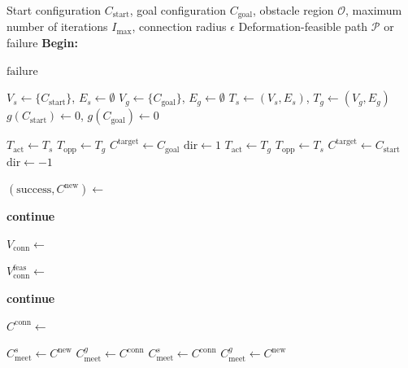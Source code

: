 \documentclass{pas}
\begin{document}
\begin{algorithm}[t]
\small
\caption{Global Cable Routing Planner}
\label{alg:gcr_main}
\begin{algorithmic}[1]
\Require Start configuration $C_{\mathrm{start}}$, goal configuration
$C_{\mathrm{goal}}$, obstacle region $\mathcal{O}$, maximum number of
iterations $I_{\max}$, connection radius $\epsilon$
\Ensure Deformation-feasible path $\mathcal{P}$ or failure
\Statex \textbf{Begin:}

    \State \Return $\mathrm{failure}$
\EndIf

\State $V_s\gets\{C_{\mathrm{start}}\}$, $E_s\gets\emptyset$
\State $V_g\gets\{C_{\mathrm{goal}}\}$, $E_g\gets\emptyset$
\State $T_s\gets(V_s,E_s)$, $T_g\gets(V_g,E_g)$
\State $g(C_{\mathrm{start}})\gets0$, $g(C_{\mathrm{goal}})\gets0$


        \State $T_{\mathrm{act}}\gets T_s$
        \State $T_{\mathrm{opp}}\gets T_g$
        \State $C^{\mathrm{target}}\gets C_{\mathrm{goal}}$
        \State $\mathrm{dir}\gets 1$
    \Else
        \State $T_{\mathrm{act}}\gets T_g$
        \State $T_{\mathrm{opp}}\gets T_s$
        \State $C^{\mathrm{target}}\gets C_{\mathrm{start}}$
        \State $\mathrm{dir}\gets -1$
    \EndIf

    \State $(\mathrm{success},C^{\mathrm{new}})\gets$

        \State \textbf{continue}
    \EndIf

    \State $V_{\mathrm{conn}}\gets$

    \State $V_{\mathrm{conn}}^{\mathrm{feas}}\gets$

        \State \textbf{continue}
    \EndIf

    \State $C^{\mathrm{conn}}\gets$

        \State $C_{\mathrm{meet}}^{s}\gets C^{\mathrm{new}}$
        \State $C_{\mathrm{meet}}^{g}\gets C^{\mathrm{conn}}$
    \Else
        \State $C_{\mathrm{meet}}^{s}\gets C^{\mathrm{conn}}$
        \State $C_{\mathrm{meet}}^{g}\gets C^{\mathrm{new}}$
    \EndIf


\end{algorithmic}
\end{algorithm}
\end{document}
